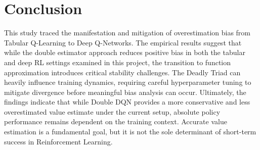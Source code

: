 \documentclass[11pt,a4paper]{article}
\begin{document}
\section{Conclusion}
This study traced the manifestation and mitigation of overestimation bias from Tabular Q-Learning to Deep Q-Networks. The empirical results suggest that while the double estimator approach reduces positive bias in both the tabular and deep RL settings examined in this project, the transition to function approximation introduces critical stability challenges. The Deadly Triad can heavily influence training dynamics, requiring careful hyperparameter tuning to mitigate divergence before meaningful bias analysis can occur. Ultimately, the findings indicate that while Double DQN provides a more conservative and less overestimated value estimate under the current setup, absolute policy performance remains dependent on the training context. Accurate value estimation is a fundamental goal, but it is not the sole determinant of short-term success in Reinforcement Learning.
\end{document}
